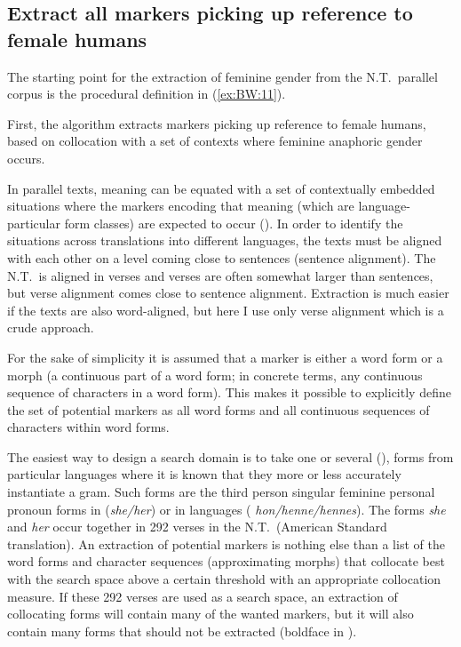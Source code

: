 \documentclass[output=collectionpaper]{langsci/langscibook}
\begin{document}
\subsection{Extract all markers picking up reference to female humans}
\label{sec:BW:3.2}

The starting point for the extraction of feminine gender from the N.T.\ parallel corpus is the procedural definition in (\ref{ex:BW:11}).

First, the algorithm extracts markers picking up reference to female humans, based on collocation with a set of contexts where feminine anaphoric gender occurs.

\newpage 
In parallel texts, meaning can be equated with a set of contextually embedded situations where the markers encoding that meaning (which are language-particular form classes) are expected to occur (\citealt[672]{Waelchli2012}). In order to identify the situations across translations into different languages, the texts must be aligned with each other on a level coming close to sentences (sentence alignment). The N.T.\ is aligned in verses and verses are often somewhat larger than sentences, but verse alignment comes close to sentence alignment. Extraction is much easier if the texts are also word-aligned, but here I use only verse alignment which is a crude approach.

For the sake of simplicity it is assumed that a marker is either a word form or a morph (a continuous part of a word form; in concrete terms, any continuous sequence of characters in a word form). This makes it possible to explicitly define the set of potential markers as all word forms and all continuous sequences of characters within word forms.

The easiest way to design a search domain is to take one or several  (\citealt{Dahl2016}), forms from particular languages where it is known that they more or less accurately instantiate a gram. Such forms are the third person singular feminine personal pronoun forms in  (\textit{she/her}) or in  languages ( \textit{hon/henne/hennes}). The  forms \textit{she} and \textit{her} occur together in 292 verses in the N.T.\ (American Standard translation). An extraction of potential markers is nothing else than a list of the word forms and character sequences (approximating morphs) that collocate best with the search space above a certain threshold with an appropriate collocation measure. If these 292 verses are used as a search space, an extraction of collocating forms will contain many of the wanted markers, but it will also contain many forms that should not be extracted (boldface in ).
\end{document}
